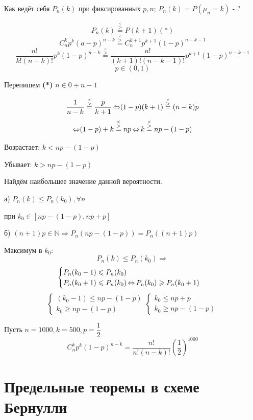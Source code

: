 Как ведёт себя $P_n(k)$ при фиксированных $p,n$; $P_n(k) = P(\mu_n = k)$ - ?

\[ P_n(k) \stackrel{\stackrel{<}{>}}{=} P(k+1) \mathbf{(*)} \]
\[ C_n^kp^k(a-p)^{n-k} \stackrel{\stackrel{<}{>}}{=} C_n^{k+1}p^{k+1}(1-p)^{n-k-1} \]
\[ \dfrac{n!}{k!(n-k)!}p^k(1-p)^{n-k} \stackrel{\stackrel{<}{>}}{=} \dfrac{n!}{(k+1)!(n-k-1)!}p^{k+1}(1-p)^{n-k-1} \]
\[ p \in (0,1) \]

Перепишем \textbf{(*)} $n \in 0 \div n-1$

\[ \dfrac{1}{n-k} \stackrel{\stackrel{<}{>}}{=} \dfrac{p}{k+1} \operatorname{\Leftrightarrow} (1-p)(k+1) \stackrel{\stackrel{<}{>}}{=} (n-k)p \]
\[ \operatorname{\Leftrightarrow} (1-p)+k \stackrel{\stackrel{<}{>}}{=} np \operatorname{\Leftrightarrow} k \stackrel{\stackrel{<}{>}}{=} np - (1-p) \]

Возрастает: $k < np - (1-p)$

Убывает: $k > np - (1-p)$

Найдём наибольшее значение данной вероятности.

\begin{theorem}[Утверждение]
	а) $ P_n(k) \le P_n(k_0), \forall n $
	
	при $k_0 \in [np - (1-p), np+p]$
	
	б) $ (n+1)p \in \mathbb{N} \Rightarrow P_n(np-(1-p)) = P_n((n+1)p) $
	
	Максимум в $k_0$:
	\[ P_n(k) \le P_n(k_0) \Rightarrow \]
	\[
	\begin{cases}
		P_n(k_0 - 1) \leqslant P_n(k_0) \\
		P_n(k_0 + 1) \leqslant P_n(k_0) \operatorname{\Leftrightarrow} P_n(k_0) \geqslant P_n(k_0+1)
	\end{cases} 
	\]
	\[
	\begin{cases}
		(k_0 - 1) \le np - (1-p) \\
		k_0 \ge np - (1-p)
	\end{cases}
	\begin{cases}
		k_0 \le np + p \\
		k_0 \ge np - (1-p)
	\end{cases}
	\]
\end{theorem}

\begin{theorem}
	Пусть $n=1000, k = 500, p = \dfrac{1}{2}$
	\[ C_n^kp^k(1-p)^{n-k} = \dfrac{n!}{n!(n-k)!}\left( \dfrac{1}{2} \right)^{1000} \]
\end{theorem}

\section{Предельные теоремы в схеме Бернулли}

